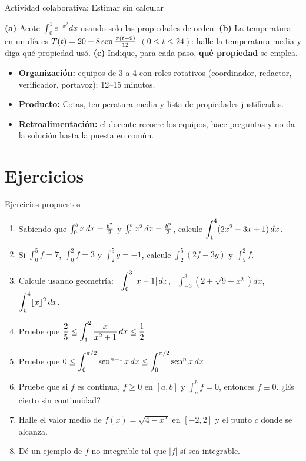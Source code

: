 \documentclass[10pt,aspectratio=169]{beamer}
\begin{document}
\begin{frame}{Actividad colaborativa: Estimar sin calcular}
  \small
  \begin{activa}
    \textbf{(a)} Acote $\int_0^1e^{-x^2}dx$ usando solo las propiedades de orden. \textbf{(b)} La temperatura en un día es $T(t)=20+8\operatorname{sen}\frac{\pi(t-9)}{12}$ $(0\le t\le24)$: halle la temperatura media y diga qué propiedad usó. \textbf{(c)} Indique, para cada paso, \textbf{qué propiedad} se emplea.
  \end{activa}
  \begin{itemize}
    \item \textbf{Organización:} equipos de 3 a 4 con roles rotativos (coordinador, redactor, verificador, portavoz); 12--15 minutos.
    \item \textbf{Producto:} Cotas, temperatura media y lista de propiedades justificadas.
    \item \textbf{Retroalimentación:} el docente recorre los equipos, hace preguntas y no da la solución hasta la puesta en común.
  \end{itemize}
\end{frame}

\section{Ejercicios}

\begin{frame}{Ejercicios propuestos}
  \begin{ejercicio}
    \begin{enumerate}
      \item Sabiendo que $\int_0^bx\,dx=\frac{b^2}{2}$ y $\int_0^bx^2\,dx=\frac{b^3}{3}$, calcule
        $\displaystyle\int_1^4(2x^2-3x+1)\,dx$.
      \item Si $\int_0^5f=7$, $\int_0^2f=3$ y $\int_2^5g=-1$, calcule $\int_2^5(2f-3g)$ y $\int_5^2f$.
      \item Calcule usando geometría: \ $\displaystyle\int_{0}^{3}|x-1|\,dx$, \ $\displaystyle\int_{-3}^{3}\left(2+\sqrt{9-x^2}\right)dx$,
        \ $\displaystyle\int_0^4\lfloor x\rfloor^2\,dx$.
      \item Pruebe que $\displaystyle\frac{2}{5}\le\int_1^2\frac{x}{x^2+1}\,dx\le\frac12$.
      \item Pruebe que $\displaystyle 0\le\int_0^{\pi/2}\operatorname{sen}^{n+1}x\,dx\le\int_0^{\pi/2}\operatorname{sen}^nx\,dx$.
      \item Pruebe que si $f$ es continua, $f\ge0$ en $[a,b]$ y $\int_a^bf=0$, entonces $f\equiv0$.
        ¿Es cierto sin continuidad?
      \item Halle el valor medio de $f(x)=\sqrt{4-x^2}$ en $[-2,2]$ y el punto $c$ donde se alcanza.
      \item Dé un ejemplo de $f$ no integrable tal que $|f|$ sí sea integrable.
    \end{enumerate}
  \end{ejercicio}
\end{frame}
\end{document}
